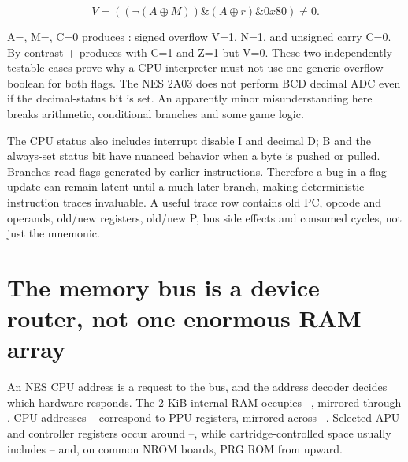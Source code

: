 \[
V= ((\neg(A\oplus M))\mathbin{\&}(A\oplus r)\mathbin{\&}0x80)\ne0.
\]

A=, M=, C=0 produces : signed overflow V=1, N=1, and unsigned carry C=0. By contrast + produces  with C=1 and Z=1 but V=0. These two independently testable cases prove why a CPU interpreter must not use one generic overflow boolean for both flags. The NES 2A03 does not perform BCD decimal ADC even if the decimal-status bit is set. An apparently minor misunderstanding here breaks arithmetic, conditional branches and some game logic.

The CPU status also includes interrupt disable I and decimal D; B and the always-set status bit have nuanced behavior when a byte is pushed or pulled. Branches read flags generated by earlier instructions. Therefore a bug in a flag update can remain latent until a much later branch, making deterministic instruction traces invaluable. A useful trace row contains old PC, opcode and operands, old/new registers, old/new P, bus side effects and consumed cycles, not just the mnemonic.

\section{The memory bus is a device router, not one enormous RAM array}\label{01-foundations-i-ch016-the-memory-bus-is-a-device-router-not-one-enormous-ram-array}

\hypertarget{01-foundations-i-ch016-the-memory-bus-is-a-device-router-not-one-enormous-ram-array}{}

An NES CPU address is a request to the bus, and the address decoder decides which hardware responds. The 2 KiB internal RAM occupies --, mirrored through . CPU addresses -- correspond to PPU registers, mirrored across --. Selected APU and controller registers occur around --, while cartridge-controlled space usually includes -- and, on common NROM boards, PRG ROM from  upward.

